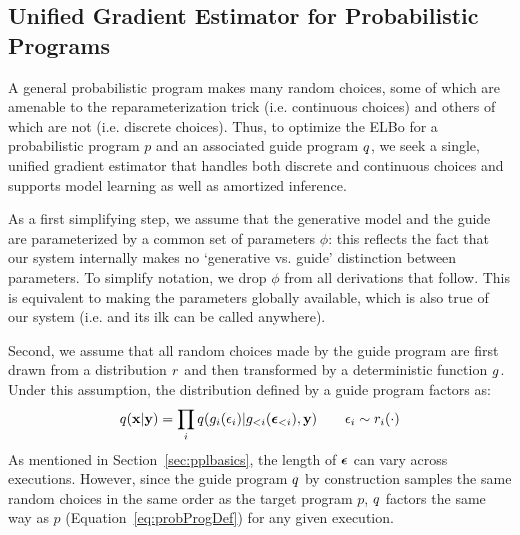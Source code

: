 \subsection{Unified Gradient Estimator for Probabilistic Programs}

A general probabilistic program makes many random choices, some of which are amenable to the reparameterization trick (i.e. continuous choices) and others of which are not (i.e. discrete choices). Thus, to optimize the ELBo for a probabilistic program $p$ and an associated guide program $q$, we seek a single, unified gradient estimator that handles both discrete and continuous choices and supports model learning as well as amortized inference.

As a first simplifying step, we assume that the generative model and the guide are parameterized by a common set of parameters $\phi$: this reflects the fact that our system internally makes no `generative vs. guide' distinction between parameters. To simplify notation, we drop $\phi$ from all derivations that follow. This is equivalent to making the parameters globally available, which is also true of our system (i.e.  and its ilk can be called anywhere).

Second, we assume that all random choices made by the guide program are first drawn from a distribution $r$ and then transformed by a deterministic function $g$. Under this assumption, the distribution defined by a guide program factors as:
\begin{equation*}
q(\mathbf{x} | \mathbf{y}) = \prod_i q(g_i(\epsilon_i) | g_{<i}(\bm{\epsilon}_{<i}), \mathbf{y}) \hspace{2em} \epsilon_i \sim r_i(\cdot)
\end{equation*}
As mentioned in Section~\ref{sec:pplbasics}, the length of $\bm{\epsilon}$ can vary across executions. However, since the guide program $q$ by construction samples the same random choices in the same order as the target program $p$, $q$ factors the same way as $p$ (Equation~\ref{eq:probProgDef}) for any given execution. 

